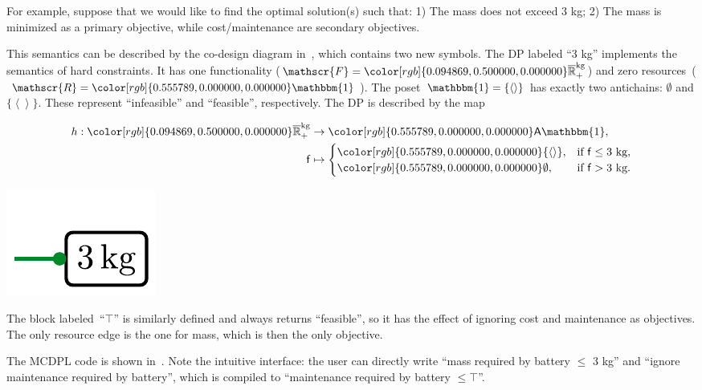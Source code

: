 \documentclass[twocolumn,english]{IEEEtran}
\theoremstyle{definition}
\theoremstyle{plain}
\theoremstyle{definition}
\theoremstyle{remark}
\theoremstyle{definition}
\theoremstyle{plain}
\theoremstyle{plain}
\newcommand{\aword}[1]{\mathsf{#1}}
\newcommand{\vmath}[1]{\aword{#1}}
\newcommand{\antichains}{\vmath{A}}
\newcommand{\ftor}{{h}}
\newcommand{\Rcomp}{\overline{\mathbb{R}}_+}
\newcommand{\funsp}{\mathscr{F}}
\newcommand{\fun}{\vmath{f}}
\newcommand{\ressp}{\mathscr{R}}
\newcommand{\colR}{\color[rgb]{0.555789,0.000000,0.000000}}
\newcommand{\colF}{\color[rgb]{0.094869,0.500000,0.000000}}
\newcommand{\R}[1]{{\colR #1}}
\newcommand{\F}[1]{{\colF #1}}
\newcommand{\One}{\mathbbm{1}}
\begin{document}
For example, suppose that we would like to find the optimal solution(s)
such that: 1) The mass does not exceed 3 kg; 2) The mass is minimized
as a primary objective, while cost/maintenance are secondary objectives.

This semantics can be described by the co-design diagram in~,
which contains two new symbols. The DP labeled ``3 kg'' implements
the semantics of hard constraints. It has one functionality ($\funsp=\F{\Rcomp^{\text{kg}}}$)
and zero resources~($\ressp=\R{\One}$). The poset~$\One=\{\left\langle \right\rangle \}$
has exactly two antichains: $\emptyset$ and $\{\left\langle \right\rangle \}$.
These represent ``infeasible'' and ``feasible'', respectively.
The DP is described by the map

\quad\quad
\begin{minipage}[c]{5cm}
\begin{align*}
\ftor:\F{\mathbb{\overline{R}}_{+}^{\text{kg}}} & \rightarrow\R{\antichains\One},\\
\fun & \mapsto\begin{cases}
\R{\{\left\langle \right\rangle \}}, & \text{if }\fun\leq\text{3 kg},\\
\R{\emptyset}, & \text{if }\fun>\text{3 kg}.
\end{cases}
\end{align*}

\end{minipage}\quad\includegraphics[scale=0.45]{batteries_3kg}

\smallskip{}

\noindent The block labeled~``$\top$'' is similarly defined and
always returns ``feasible'', so it has the effect of ignoring \R{cost}
and \R{maintenance} as objectives. The only resource edge is the
one for \R{mass}, which is then the only objective.

The MCDPL code is shown in~. Note the intuitive
interface: the user can directly write ``mass required by battery
$\leq$ 3 kg'' and ``ignore maintenance required by battery'',
which is compiled to ``maintenance required by battery $\leq\top$''.
\end{document}

